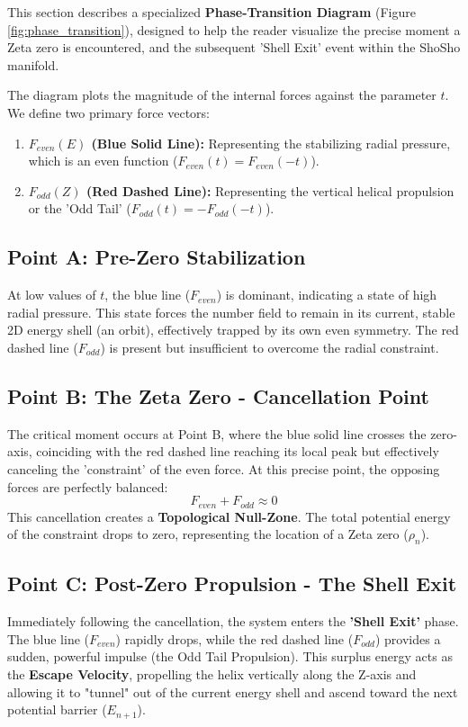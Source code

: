 \documentclass[11pt,a4paper]{article}
\begin{document}
This section describes a specialized \textbf{Phase-Transition Diagram} (Figure \ref{fig:phase_transition}), designed to help the reader visualize the precise moment a Zeta zero is encountered, and the subsequent 'Shell Exit' event within the ShoSho manifold. 

The diagram plots the magnitude of the internal forces against the parameter $t$. We define two primary force vectors:
\begin{enumerate}
    \item \textbf{$F_{even}(E)$ (Blue Solid Line):} Representing the stabilizing radial pressure, which is an even function ($F_{even}(t) = F_{even}(-t)$).
    \item \textbf{$F_{odd}(Z)$ (Red Dashed Line):} Representing the vertical helical propulsion or the 'Odd Tail' ($F_{odd}(t) = -F_{odd}(-t)$).
\end{enumerate}

\subsection{Point A: Pre-Zero Stabilization}
At low values of $t$, the blue line ($F_{even}$) is dominant, indicating a state of high radial pressure. This state forces the number field to remain in its current, stable 2D energy shell (an orbit), effectively trapped by its own even symmetry. The red dashed line ($F_{odd}$) is present but insufficient to overcome the radial constraint.

\subsection{Point B: The Zeta Zero - Cancellation Point}
The critical moment occurs at Point B, where the blue solid line crosses the zero-axis, coinciding with the red dashed line reaching its local peak but effectively canceling the 'constraint' of the even force. At this precise point, the opposing forces are perfectly balanced:
\begin{equation}
    F_{even} + F_{odd} \approx 0
\end{equation}
This cancellation creates a \textbf{Topological Null-Zone}. The total potential energy of the constraint drops to zero, representing the location of a Zeta zero ($\rho_n$). 

\subsection{Point C: Post-Zero Propulsion - The Shell Exit}
Immediately following the cancellation, the system enters the \textbf{'Shell Exit'} phase. The blue line ($F_{even}$) rapidly drops, while the red dashed line ($F_{odd}$) provides a sudden, powerful impulse (the Odd Tail Propulsion). This surplus energy acts as the \textbf{Escape Velocity}, propelling the helix vertically along the Z-axis and allowing it to "tunnel" out of the current energy shell and ascend toward the next potential barrier ($E_{n+1}$).
\end{document}
